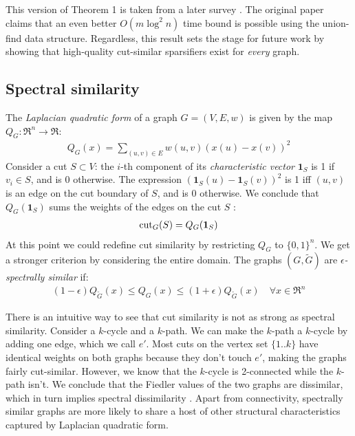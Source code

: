 \documentclass{article}
\begin{document}
This version of Theorem 1 is taken from a later survey \cite{TheSurvey}. The
original paper claims that an even better $O(m\log^2 n)$ time bound is
possible using the union-find data structure. Regardless, this result sets
the stage for future work by showing that high-quality cut-similar
sparsifiers exist for \textit{every} graph. 

\subsection{Spectral similarity}

The \textit{Laplacian quadratic form} of a graph $G = (V, E, w)$ is given by
the map $Q_G : \Re^n \rightarrow \Re$:
\begin{align*}
    Q_G(x) = \sum_{(u, v) \in E} w(u, v)(x(u) - x(v))^2
\end{align*}
Consider a cut $S \subset V$: the $i$-th component of its
\textit{characteristic vector} $\mathbf{1}_S$ is 1 if $v_i \in S$, and is 0
otherwise. The expression $(\mathbf{1}_S(u) - \mathbf{1}_S(v))^2$ is 1 iff
$(u, v)$ is an edge on the cut boundary of $S$, and is 0 otherwise. We
conclude that $Q_G(\mathbf{1}_S)$ sums the weights of the edges on the cut
$S$ \cite{TheSurvey}:
\begin{align*}
    \text{cut}_{G}(S) = Q_G(\mathbf{1}_S)
\end{align*}
At this point we could redefine cut similarity by restricting $Q_G$ to $\{0,
1\}^n$. We get a stronger criterion by considering the entire domain.  The
graphs $(G, \tilde{G})$ are \textit{$\epsilon$-spectrally similar} if:
\begin{align*}
    (1 - \epsilon)Q_{\tilde{G}}(x) \leq Q_G(x) \leq (1 +
    \epsilon)Q_{\tilde{G}}(x) \quad \forall{x \in \Re^n}
\end{align*}

There is an intuitive way to see that cut similarity is not as strong as
spectral similarity. Consider a $k$-cycle and a $k$-path. We can make the
$k$-path a $k$-cycle by adding one edge, which we call $e'$. Most cuts on
the vertex set $\{1..k\}$ have identical weights on both graphs because they
don't touch $e'$, making the graphs fairly cut-similar. However, we know
that the $k$-cycle is 2-connected while the $k$-path isn't. We conclude that
the Fiedler values of the two graphs are dissimilar, which in turn implies
spectral dissimilarity \cite{Fiedler}. Apart from connectivity, spectrally
similar graphs are more likely to share a host of other structural
characteristics captured by Laplacian quadratic form.
\end{document}
